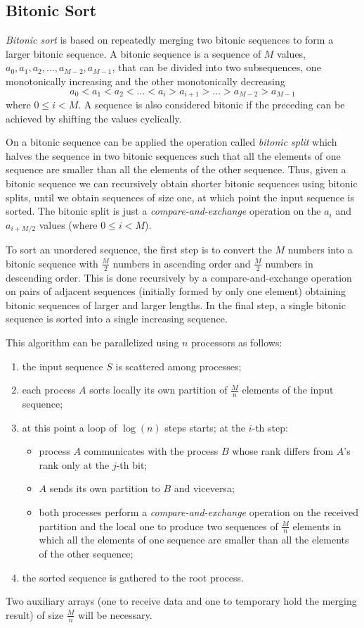 \subsection{Bitonic Sort}
\textit{Bitonic sort} is based on repeatedly merging two bitonic sequences to form a larger bitonic sequence. A bitonic sequence is a sequence of $M$ values, $a_0, a_1, a_2, \dots, a_{M-2}, a_{M-1}$, that can be divided into two subsequences, one monotonically increasing and the other monotonically decreasing
\[
a_0 < a_1 < a_2 < \dots < a_i > a_{i+1} > \dots > a_{M-2} > a_{M-1}
\]
where $0 \leq i < M$.
A sequence is also considered bitonic if the preceding can be achieved by shifting the values cyclically.

On a bitonic sequence can be applied the operation called \textit{bitonic split} which halves the sequence in two bitonic sequences such that all the elements of one sequence are smaller than all the elements of the other sequence. Thus, given a bitonic sequence we can recursively obtain shorter bitonic sequences using bitonic splits, until we obtain sequences of size one, at which point the input sequence is sorted. The bitonic split is just a \textit{compare-and-exchange} operation on the $a_i$ and $a_{i+M/2}$ values (where $0 \le i < M$).

To sort an unordered sequence, the first step is to convert the $M$ numbers into a bitonic sequence with $\frac{M}{2}$ numbers in ascending order and $\frac{M}{2}$ numbers in descending order. This is done recursively by a compare-and-exchange operation on pairs of adjacent sequences (initially formed by only one element) obtaining bitonic sequences of larger and larger lengths. In the final step, a single bitonic sequence is sorted into a single increasing sequence.

This algorithm can be parallelized using $n$ processors as follows:
\begin{enumerate}
	\item the input sequence $S$ is scattered among processes;
	\item each process $A$ sorts locally its own partition of $\frac{M}{n}$ elements of the input sequence;
	\item at this point a loop of $\log(n)$ steps starts; at the $i$-th step:
		\begin{itemize}
			\item process $A$ communicates with the process $B$ whose rank differs from $A$'s rank only at the $j$-th bit;
			\item $A$ sends its own partition to $B$ and viceversa;			
			\item both processes perform a \textit{compare-and-exchange} operation on the received partition and the local one to produce two sequences of $\frac{M}{n}$ elements in which all the elements of one sequence are smaller than all the elements of the other sequence;			
		\end{itemize}
	\item the sorted sequence is gathered to the root process.
\end{enumerate}
Two auxiliary arrays (one to receive data and one to temporary hold the merging result) of size $\frac{M}{n}$ will be necessary.


